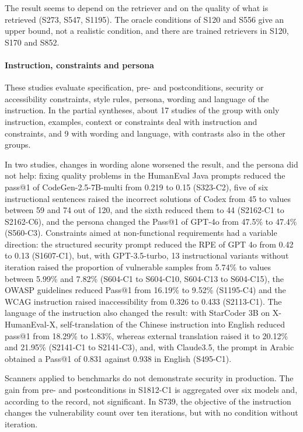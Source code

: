 The result seems to depend on the retriever and on the quality of what is retrieved (S273, S547, S1195). The oracle conditions of S120 and S556 give an upper bound, not a realistic condition, and there are trained retrievers in S120, S170 and S852.

\paragraph{Instruction, constraints and persona}
These studies evaluate specification, pre- and postconditions, security or accessibility constraints, style rules, persona, wording and language of the instruction. In the partial syntheses, about 17 studies of the group with only instruction, examples, context or constraints deal with instruction and constraints, and 9 with wording and language, with contrasts also in the other groups.

In two studies, changes in wording alone worsened the result, and the persona did not help: fixing quality problems in the HumanEval Java prompts reduced the pass@1 of CodeGen-2.5-7B-multi from 0.219 to 0.15 (S323-C2), five of six instructional sentences raised the incorrect solutions of Codex from 45 to values between 59 and 74 out of 120, and the sixth reduced them to 44 (S2162-C1 to S2162-C6), and the persona changed the Pass@1 of GPT-4o from 47.5\% to 47.4\% (S560-C3).
Constraints aimed at non-functional requirements had a variable direction: the structured security prompt reduced the RPE of GPT 4o from 0.42 to 0.13 (S1607-C1), but, with GPT-3.5-turbo, 13 instructional variants without iteration raised the proportion of vulnerable samples from 5.74\% to values between 5.99\% and 7.82\% (S604-C1 to S604-C10, S604-C13 to S604-C15), the OWASP guidelines reduced Pass@1 from 16.19\% to 9.52\% (S1195-C4) and the WCAG instruction raised inaccessibility from 0.326 to 0.433 (S2113-C1).
The language of the instruction also changed the result: with StarCoder 3B on X-HumanEval-X, self-translation of the Chinese instruction into English reduced pass@1 from 18.29\% to 1.83\%, whereas external translation raised it to 20.12\% and 21.95\% (S2141-C1 to S2141-C3), and, with Claude3.5, the prompt in Arabic obtained a Pass@1 of 0.831 against 0.938 in English (S495-C1).

Scanners applied to benchmarks do not demonstrate security in production. The gain from pre- and postconditions in S1812-C1 is aggregated over six models and, according to the record, not significant. In S739, the objective of the instruction changes the vulnerability count over ten iterations, but with no condition without iteration.

